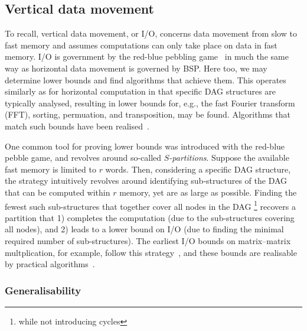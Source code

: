 \documentclass[oneside,reqno, a4paper]{amsart}
\numberwithin{equation}{section}
\begin{document}
\subsection{Vertical data movement}

To recall,
vertical data movement,
or I/O, %
concerns data movement from slow to fast memory and assumes computations can only take place on data in fast memory.
I/O is government by the red-blue pebbling game~\cite{HongKung} in much the same way as horizontal data movement is governed by BSP.
Here too,
we may determine lower bounds and find algorithms that achieve them.
This operates similarly as for horizontal computation in that specific DAG structures are typically analysed,
resulting in
lower bounds for,
e.g.,
the fast Fourier transform (FFT), sorting, permuation, and transposition,
may be found. %
Algorithms that match such bounds have been realised~\cite{aggarwal88}.

One common tool for proving lower bounds was %
introduced with the red-blue pebble game, and
revolves around so-called \emph{$S$-partitions}.
Suppose the available fast memory is limited to $r$ words. %
Then, considering a specific DAG structure,
the strategy intuitively revolves around identifying sub-structures of the DAG that can be computed within $r$ memory,
yet are as large as possible.
Finding the fewest such sub-structures that together cover all nodes in the DAG%
\footnote{while not introducing cycles}
recovers a partition that
1) completes the computation (due to the sub-structures covering all nodes), and
2) leads to a lower bound on I/O (due to finding the minimal required number of sub-structures).
The earliest I/O bounds on matrix--matrix multplication, for example, follow this strategy~\cite{HongKung,toledo99,irony04},
and these bounds are realisable by practical algorithms~\cite{rutledge52,mckellar69}.

\subsubsection*{Generalisability}
\end{document}
